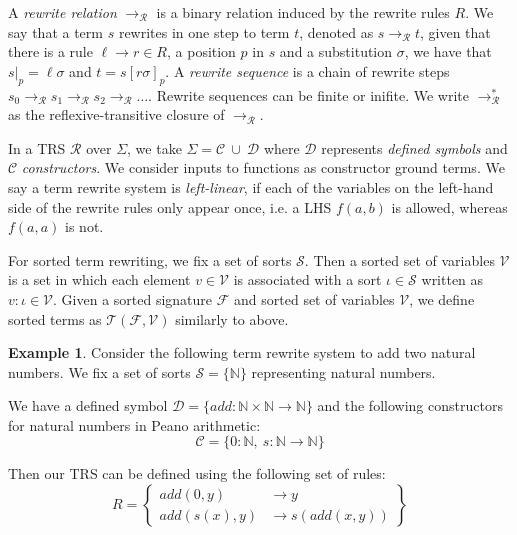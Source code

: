 \documentclass{report}
\theoremstyle{definition}
\newtheorem{example_inner}{Example}
\newenvironment{example}
  {\begin{customblock}\begin{example_inner}}
  {\end{example_inner}\end{customblock}}
\begin{document}
A \textit{rewrite relation} $\to_\mathcal{R}$ is a binary relation induced by the rewrite rules $R$. We say that a term $s$ rewrites in one step to term $t$, denoted as $s \to_\mathcal{R} t$, given that there is a rule $\ell \to r \in R$, a position $p$ in $s$ and a substitution $\sigma$, we have that $s|_p = \ell\sigma$ and $t = s[r\sigma]_p$. A \textit{rewrite sequence} is a chain of rewrite steps $s_0 \to_\mathcal{R} s_1 \to_\mathcal{R} s_2 \to_\mathcal{R} \dots$. Rewrite sequences can be finite or inifite. We write $\to_\mathcal{R}^*$ as the reflexive-transitive closure of $\to_\mathcal{R}$.
 
In a TRS $\mathcal{R}$ over $\Sigma$, we take $\Sigma = \mathcal{C}\ \cup\ \mathcal{D}$ where $\mathcal{D}$ represents \textit{defined symbols} and $\mathcal{C}$ \textit{constructors}. We consider inputs to functions as constructor ground terms. We say a term rewrite system is \textit{left-linear}, if each of the variables on the left-hand side of the rewrite rules only appear once, i.e. a LHS $f(a,b)$ is allowed, whereas $f(a,a)$ is not.

For sorted term rewriting, we fix a set of sorts $\mathcal{S}$. Then a sorted set of variables $\mathcal{V}$ is a set in which each element $v \in \mathcal{V}$ is associated with a sort $\iota \in \mathcal{S}$ written as $v : \iota \in \mathcal{V}$. Given a sorted signature $\mathcal{F}$ and sorted set of variables $\mathcal{V}$, we define sorted terms as $\mathcal{T}(\mathcal{F}, \mathcal{V})$ similarly to above. 

\begin{example}
    Consider the following term rewrite system to add two natural numbers.
    We fix a set of sorts $\mathcal{S} = \{\mathbb{N}\}$ representing natural numbers.

    We have a defined symbol $\mathcal{D} = \{add : \mathbb{N} \times \mathbb{N} \to \mathbb{N}\}$ and the following constructors for natural numbers in Peano arithmetic: 
    $$\mathcal{C} = \{0 : \mathbb{N},\ s : \mathbb{N} \to \mathbb{N}\}$$

    Then our TRS can be defined using the following set of rules:
    \[
    R = \left\{ \begin{aligned}
       add(0, y) &\rightarrow y  \\
       add(s(x), y) &\rightarrow s(add(x, y))
    \end{aligned} \right\}
    \]
    
\end{example}
\end{document}
